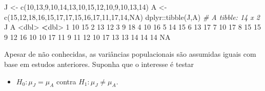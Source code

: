 \documentclass[
  10pt,
  a4paper]{book}
\newenvironment{Shaded}{\begin{snugshade}}{\end{snugshade}}
\newcommand{\CommentTok}[1]{\textcolor[rgb]{0.56,0.35,0.01}{\textit{#1}}}
\newcommand{\ConstantTok}[1]{\textcolor[rgb]{0.00,0.00,0.00}{#1}}
\newcommand{\DecValTok}[1]{\textcolor[rgb]{0.00,0.00,0.81}{#1}}
\newcommand{\ErrorTok}[1]{\textcolor[rgb]{0.64,0.00,0.00}{\textbf{#1}}}
\newcommand{\FunctionTok}[1]{\textcolor[rgb]{0.00,0.00,0.00}{#1}}
\newcommand{\NormalTok}[1]{#1}
\newcommand{\OtherTok}[1]{\textcolor[rgb]{0.56,0.35,0.01}{#1}}
\newcommand{\SpecialCharTok}[1]{\textcolor[rgb]{0.00,0.00,0.00}{#1}}
\providecommand{\tightlist}{%
  \setlength{\itemsep}{0pt}\setlength{\parskip}{0pt}}
\begin{document}
\begin{Shaded}
\begin{Highlighting}[]
\NormalTok{J }\OtherTok{\textless{}{-}} \FunctionTok{c}\NormalTok{(}\DecValTok{10}\NormalTok{,}\DecValTok{13}\NormalTok{,}\DecValTok{9}\NormalTok{,}\DecValTok{10}\NormalTok{,}\DecValTok{14}\NormalTok{,}\DecValTok{13}\NormalTok{,}\DecValTok{10}\NormalTok{,}\DecValTok{15}\NormalTok{,}\DecValTok{12}\NormalTok{,}\DecValTok{10}\NormalTok{,}\DecValTok{9}\NormalTok{,}\DecValTok{10}\NormalTok{,}\DecValTok{13}\NormalTok{,}\DecValTok{14}\NormalTok{)}
\NormalTok{A }\OtherTok{\textless{}{-}} \FunctionTok{c}\NormalTok{(}\DecValTok{15}\NormalTok{,}\DecValTok{12}\NormalTok{,}\DecValTok{18}\NormalTok{,}\DecValTok{16}\NormalTok{,}\DecValTok{15}\NormalTok{,}\DecValTok{17}\NormalTok{,}\DecValTok{17}\NormalTok{,}\DecValTok{15}\NormalTok{,}\DecValTok{16}\NormalTok{,}\DecValTok{17}\NormalTok{,}\DecValTok{11}\NormalTok{,}\DecValTok{17}\NormalTok{,}\DecValTok{14}\NormalTok{,}\ConstantTok{NA}\NormalTok{)}
\NormalTok{dplyr}\SpecialCharTok{::}\FunctionTok{tibble}\NormalTok{(J,A)}
\CommentTok{\# A tibble: 14 x 2}
\NormalTok{       J     A}
   \SpecialCharTok{\textless{}}\NormalTok{dbl}\SpecialCharTok{\textgreater{}} \ErrorTok{\textless{}}\NormalTok{dbl}\SpecialCharTok{\textgreater{}}
 \DecValTok{1}    \DecValTok{10}    \DecValTok{15}
 \DecValTok{2}    \DecValTok{13}    \DecValTok{12}
 \DecValTok{3}     \DecValTok{9}    \DecValTok{18}
 \DecValTok{4}    \DecValTok{10}    \DecValTok{16}
 \DecValTok{5}    \DecValTok{14}    \DecValTok{15}
 \DecValTok{6}    \DecValTok{13}    \DecValTok{17}
 \DecValTok{7}    \DecValTok{10}    \DecValTok{17}
 \DecValTok{8}    \DecValTok{15}    \DecValTok{15}
 \DecValTok{9}    \DecValTok{12}    \DecValTok{16}
\DecValTok{10}    \DecValTok{10}    \DecValTok{17}
\DecValTok{11}     \DecValTok{9}    \DecValTok{11}
\DecValTok{12}    \DecValTok{10}    \DecValTok{17}
\DecValTok{13}    \DecValTok{13}    \DecValTok{14}
\DecValTok{14}    \DecValTok{14}    \ConstantTok{NA}
\end{Highlighting}
\end{Shaded}

Apesar de não conhecidas, as variâncias populacionais são assumidas iguais com base em estudos anteriores. Suponha que o interesse é testar

\begin{itemize}
\tightlist
\item
  \(H_0: \mu_J = \mu_A\) contra \(H_1: \mu_J \neq \mu_A\).
\end{itemize}
\end{document}
